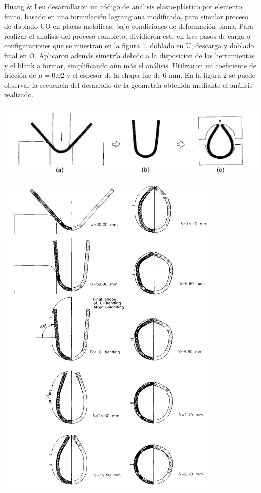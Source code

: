 Huang & Leu \cite{huang1995} desarrollaron un código de análisis elasto-plástico por elemento finito, basado en una formulación 
lagrangiana modificada, para simular proceso de doblado UO en placas metálicas, bajo condiciones de deformación 
plana. Para realizar el análisis del proceso completo, dividieron este en tres pasos de carga o configuraciones 
que se muestran en la figura 1, doblado en U, descarga y doblado final en O. Aplicaron además simetría debido a la 
disposicion de las herramientas y el blank a formar, simplificando aún más el análisis. Utilizaron un coeficiente 
de fricción de $\mu = 0.02$ y el espesor de la chapa fue de 6 mm. En la figura 2 se puede observar la secuencia del 
desarrollo de la geometría obtenida mediante el análisis realizado. \\

\begin{center}
\includegraphics[scale=0.95]{src/ch1/uo-bending.png}
\end{center}

\begin{center}
\includegraphics[scale=0.75]{src/ch1/shape_sequence.png}
\end{center}